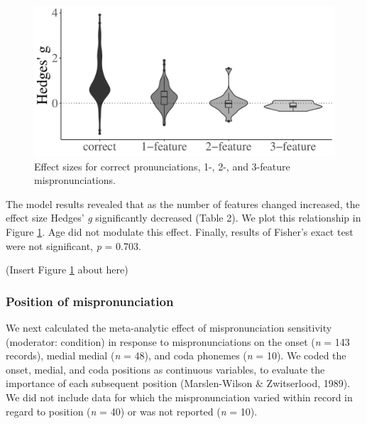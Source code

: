 \documentclass[
  man, noextraspace]{apa6}
\begin{document}
\begin{figure}
\centering
\includegraphics{VonHolzenBergmann_MPMetaAnalysis_files/figure-latex/PlotFeatEffect-1.pdf}
\caption{\label{fig:PlotFeatEffect}Effect sizes for correct pronunciations, 1-, 2-, and 3-feature mispronunciations.}
\end{figure}

The model results revealed that as the number of features changed increased, the effect size Hedges' \emph{g} significantly decreased (Table 2). We plot this relationship in Figure \ref{fig:PlotFeatEffect}. Age did not modulate this effect. Finally, results of Fisher's exact test were not significant, \emph{p} = 0.703.

(Insert Figure \ref{fig:PlotFeatEffect} about here)

\hypertarget{position-of-mispronunciation}{%
\subsubsection{Position of mispronunciation}\label{position-of-mispronunciation}}

We next calculated the meta-analytic effect of mispronunciation sensitivity (moderator: condition) in response to mispronunciations on the onset (\emph{n} = 143 records), medial medial (\emph{n} = 48), and coda phonemes (\emph{n} = 10). We coded the onset, medial, and coda positions as continuous variables, to evaluate the importance of each subsequent position (Marslen-Wilson \& Zwitserlood, 1989). We did not include data for which the mispronunciation varied within record in regard to position (\emph{n} = 40) or was not reported (\emph{n} = 10).
\end{document}
